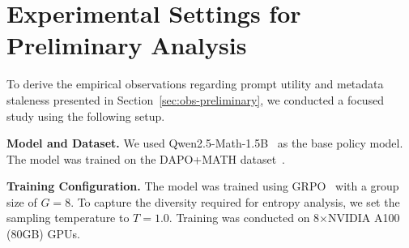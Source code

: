 \section{{Experimental Settings for Preliminary Analysis}}
\label{sec:preliminary-setup}

To derive the empirical observations regarding prompt utility and metadata staleness presented in Section~\ref{sec:obs-preliminary}, we conducted a focused study using the following setup.

\textbf{Model and Dataset.} We used Qwen2.5-Math-1.5B~\cite{yang2024qwen25mathtechnicalreportmathematical} as the base policy model. The model was trained on the DAPO+MATH dataset~\cite{yu2025dapo}. %

\textbf{Training Configuration.} The model was trained using GRPO~\cite{shao2024deepseekmath} with a group size of $G=8$. To capture the diversity required for entropy analysis, we set the sampling temperature to $T=1.0$. Training was conducted on 8$\times$NVIDIA A100 (80GB) GPUs.

